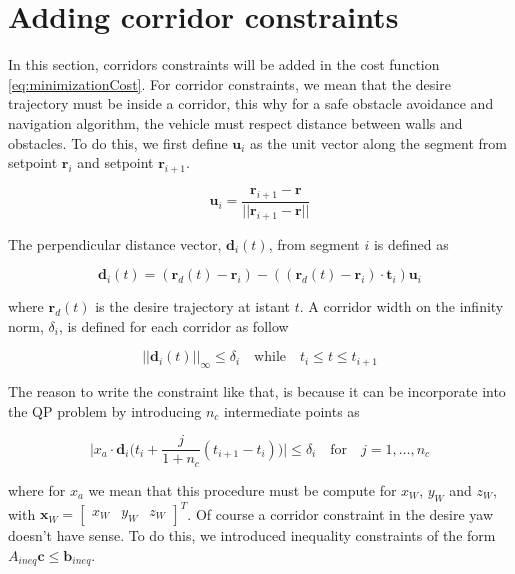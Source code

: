 \section{Adding corridor constraints}

In this section, corridors constraints will be added in the cost function \eqref{eq:minimizationCost}. For corridor constraints, we mean that the desire trajectory must be inside a corridor, this why for a safe obstacle avoidance and navigation algorithm, the vehicle must respect distance between walls and obstacles. To do this, we first define $\mathbf{u}_i$ as the unit vector along the segment from setpoint $\mathbf{r}_i$ and setpoint $\mathbf{r}_{i+1}$.

\begin{equation}
	\mathbf{u}_i=\frac{\mathbf{r}_{i+1}-\mathbf{r}}{||\mathbf{r}_{i+1}-\mathbf{r}||}
	\label{eq:unitVector}
\end{equation}

\noindent The perpendicular distance vector, $\mathbf{d}_i(t)$, from segment $i$ is defined as

\begin{equation}
	\mathbf{d}_i(t) = (\mathbf{r}_d(t)-\mathbf{r}_i)-((\mathbf{r}_d(t)-\mathbf{r}_i)\cdot\mathbf{t}_i)\mathbf{u}_i		
	\label{eq:perpendicularVector}	
\end{equation}

\noindent where $\mathbf{r}_d(t)$ is the desire trajectory at istant $t$. A corridor width on the infinity norm, $\delta_{i}$, is defined for each corridor as follow

\begin{equation}
	\big|\big|\mathbf{d}_i(t)\big|\big|_{\infty}\le\delta_i \quad \text{while} \quad t_i\le t\le t_{i+1}
	\label{eq:corridorWidth}
\end{equation}

\noindent The reason to write the constraint like that, is because it can be incorporate into the QP problem by introducing $n_c$ intermediate points as

\begin{equation}
	\Bigg|x_a\cdot\mathbf{d}_i\Big(t_i+\frac{j}{1+n_c}(t_{i+1}-t_i)\Big)\Bigg|\le\delta_i \quad \text{for} \quad j=1,\dots,n_c
	\label{eq:intermediatePoints}
\end{equation}

\noindent where for $x_a$ we mean that this procedure must be compute for $x_W$, $y_W$ and $z_W$, with $\mathbf{x}_W=\begin{bmatrix}x_W & y_W & z_W\end{bmatrix}^T$. Of course a corridor constraint in the desire yaw doesn't have sense. To do this, we introduced inequality constraints of the form $A_{ineq}\mathbf{c}\le \mathbf{b}_{ineq}$. 

